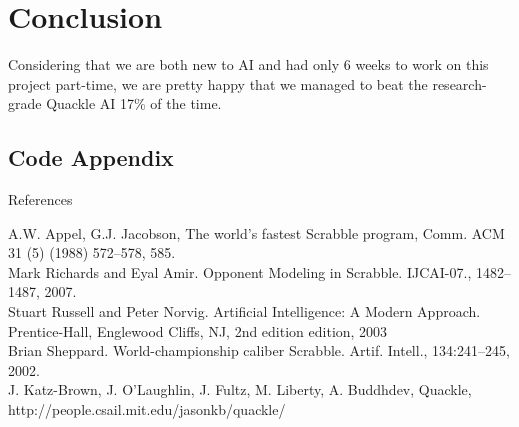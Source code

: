 \documentclass[12pt]{article}
\begin{document}
\section*{Conclusion}
Considering that we are both new to AI and had only 6 weeks to work on this project part-time, we are pretty happy that we managed to beat the research-grade Quackle AI 17\% of the time.

\clearpage
\begin{center}
 \section*{Code Appendix}
\end{center}





\vspace{ 8cm }
\clearpage
\begin{center}
{\Large References}
\end{center} 
A.W. Appel, G.J. Jacobson, The world’s fastest Scrabble program, Comm. ACM 31 (5) (1988) 572–578, 585. \\
Mark Richards and Eyal Amir. Opponent Modeling in Scrabble. IJCAI-07., 1482–1487, 2007. \\
Stuart Russell and Peter Norvig. Artificial Intelligence: A Modern Approach. Prentice-Hall,
Englewood Cliffs, NJ, 2nd edition edition, 2003 \\
Brian Sheppard. World-championship caliber Scrabble. Artif. Intell., 134:241–245, 2002. \\
J. Katz-Brown, J. O'Laughlin, J. Fultz, M. Liberty, A. Buddhdev, Quackle, http://people.csail.mit.edu/jasonkb/quackle/
\end{document}
